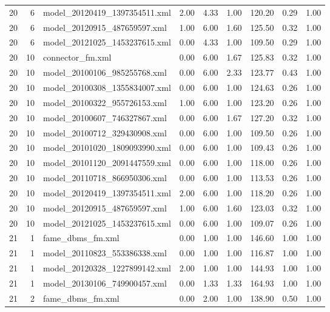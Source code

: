 \begin{table}[ht]
\begin{tabular}{rrlrrrrrr}
   20 &   6 & model\_20120419\_1397354511.xml & 2.00 & 4.33 & 1.00 & 120.20 & 0.29 & 1.00 \\ 
   20 &   6 & model\_20120915\_487659597.xml & 1.00 & 6.00 & 1.60 & 125.50 & 0.32 & 1.00 \\ 
   20 &   6 & model\_20121025\_1453237615.xml & 0.00 & 4.33 & 1.00 & 109.50 & 0.29 & 1.00 \\ 
   20 &  10 & connector\_fm.xml & 0.00 & 6.00 & 1.67 & 125.83 & 0.32 & 1.00 \\ 
   20 &  10 & model\_20100106\_985255768.xml & 0.00 & 6.00 & 2.33 & 123.77 & 0.43 & 1.00 \\ 
   20 &  10 & model\_20100308\_1355834007.xml & 0.00 & 6.00 & 1.00 & 124.63 & 0.26 & 1.00 \\ 
   20 &  10 & model\_20100322\_955726153.xml & 1.00 & 6.00 & 1.00 & 123.20 & 0.26 & 1.00 \\ 
   20 &  10 & model\_20100607\_746327867.xml & 0.00 & 6.00 & 1.67 & 127.20 & 0.32 & 1.00 \\ 
   20 &  10 & model\_20100712\_329430908.xml & 0.00 & 6.00 & 1.00 & 109.50 & 0.26 & 1.00 \\ 
   20 &  10 & model\_20101020\_1809093990.xml & 0.00 & 6.00 & 1.00 & 109.43 & 0.26 & 1.00 \\ 
   20 &  10 & model\_20101120\_2091447559.xml & 0.00 & 6.00 & 1.00 & 118.00 & 0.26 & 1.00 \\ 
   20 &  10 & model\_20110718\_866950306.xml & 0.00 & 6.00 & 1.00 & 113.53 & 0.26 & 1.00 \\ 
   20 &  10 & model\_20120419\_1397354511.xml & 2.00 & 6.00 & 1.00 & 118.20 & 0.26 & 1.00 \\ 
   20 &  10 & model\_20120915\_487659597.xml & 1.00 & 6.00 & 1.60 & 123.03 & 0.32 & 1.00 \\ 
   20 &  10 & model\_20121025\_1453237615.xml & 0.00 & 6.00 & 1.00 & 109.07 & 0.26 & 1.00 \\ 
   21 &   1 & fame\_dbms\_fm.xml & 0.00 & 1.00 & 1.00 & 146.60 & 1.00 & 1.00 \\ 
   21 &   1 & model\_20110823\_553386338.xml & 0.00 & 1.00 & 1.00 & 116.87 & 1.00 & 1.00 \\ 
   21 &   1 & model\_20120328\_1227899142.xml & 2.00 & 1.00 & 1.00 & 144.93 & 1.00 & 1.00 \\ 
   21 &   1 & model\_20130106\_749900457.xml & 0.00 & 1.33 & 1.33 & 164.93 & 1.00 & 1.00 \\ 
   21 &   2 & fame\_dbms\_fm.xml & 0.00 & 2.00 & 1.00 & 138.90 & 0.50 & 1.00 \\ 

\end{tabular}
\end{table}
